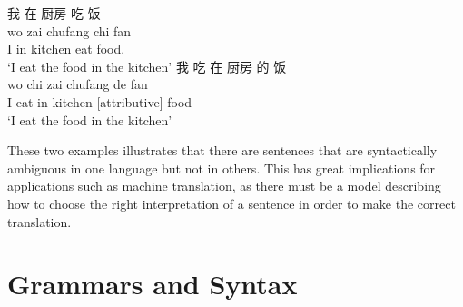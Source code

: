 \begin{CJK*}{UTF8}{gbsn}
\begin{exe}
\label{eat_food_example}
\ex 
\glll 我 在 厨房 吃 饭\\
wo zai chufang chi fan\\
I in kitchen eat food.\\
\trans `I eat the food in the kitchen'
\ex 
\glll 我 吃 在 厨房 的 饭\\
wo chi zai chufang de fan\\
I eat in kitchen [attributive] food\\
\trans `I eat the food in the kitchen'
\end{exe}
\end{CJK*}

These two examples illustrates that there are sentences that are syntactically ambiguous in one language but not in others. This has great implications for applications such as machine translation, as there must be a model describing how to choose the right interpretation of a sentence in order to make the correct translation. 



\section{Grammars and Syntax}


